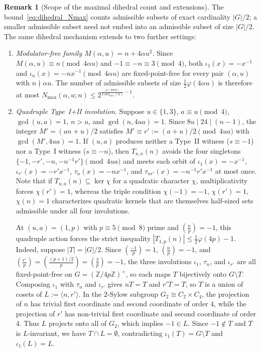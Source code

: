 \documentclass[11pt, a4paper]{article}
\theoremstyle{plain}
\theoremstyle{definition}
\newtheorem{remark}[theorem]{Remark}
\newcommand{\Z}{\mathbb{Z}}
\newcommand{\leg}[2]{\left(\frac{#1}{#2}\right)}
\begin{document}
\begin{remark}[Scope of the maximal dihedral count and extensions]\label{thm:universal_dihedral_n_plus_4au2}\label{thm:quadruple_involution}\label{thm:destruction_quadratic_kernels}
The bound~\eqref{eq:dihedral_Nmax} counts admissible subsets of exact cardinality $|G|/2$; a smaller admissible subset need not embed into an admissible subset of size $|G|/2$. The same dihedral mechanism extends to two further settings:
\begin{enumerate}[(1)]
    \item \emph{Modulator-free family $M(\alpha,u)=n+4\alpha u^{2}$.} Since $M(\alpha,u)\equiv n\pmod{4\alpha u}$ and $-1\equiv-n\equiv3\pmod 4$, both $\iota_1(x)=-x^{-1}$ and $\iota_n(x)=-nx^{-1}\pmod{4\alpha u}$ are fixed-point-free for every pair $(\alpha,u)$ with $n\nmid\alpha u$. The number of admissible subsets of size $\frac12\varphi(4\alpha u)$ is therefore at most $N_{\max}(\alpha,u;n)\le 2^{\frac{\varphi(4\alpha u)}{2\operatorname{ord}_{4\alpha u}(n)}-1}$.
    \item \emph{Quadruple Type~I+II involution.} Suppose $u\in\{1,3\}$, $a\equiv u\pmod 4$, $\gcd(u,a)=1$, $n>u$, and $\gcd(n,4ua)=1$. Since $8u\mid 24\mid(n-1)$, the integer $M'=(an+u)/2$ satisfies $M'\equiv r':=(a+u)/2\pmod{4ua}$ with $\gcd(M',4ua)=1$. If $(u,a)$ produces neither a Type~II witness ($s\equiv-1$) nor a Type~I witness ($s\equiv-n$), then $T_{u,a}(n)$ avoids the four singletons $\{-1,-r',-n,-n^{-1}r'\}\pmod{4ua}$ and meets each orbit of $\iota_1(x)=-x^{-1}$, $\iota_{r'}(x)=-r'x^{-1}$, $\tau_n(x)=-nx^{-1}$, and $\tau_{nr'}(x)=-n^{-1}r'x^{-1}$ at most once. Note that if $T_{u,a}(n)\subseteq\ker\chi$ for a quadratic character $\chi$, multiplicativity forces $\chi(r')=1$, whereas the triple condition $\chi(-1)=-1$, $\chi(r')=1$, $\chi(n)=1$ characterizes quadratic kernels that are themselves half-sized sets admissible under all four involutions.

    At $(u,a)=(1,p)$ with $p\equiv5\pmod 8$ prime and $\leg{n}{p}=-1$, this quadruple action forces the strict inequality $|T_{1,p}(n)|\le\frac12\varphi(4p)-1$. Indeed, suppose $|T|=|G|/2$. Since $\leg{-1}{p}=1$, $\leg{n}{p}=-1$, and $\leg{r'}{p}=\leg{(p+1)/2}{p}=\leg{2}{p}=-1$, the three involutions $\iota_1$, $\tau_n$, and $\iota_{r'}$ are all fixed-point-free on $G=(\Z/4p\Z)^{\times}$, so each maps $T$ bijectively onto $G\setminus T$. Composing $\iota_1$ with $\tau_n$ and $\iota_{r'}$ gives $nT=T$ and $r'T=T$, so $T$ is a union of cosets of $L:=\langle n,r'\rangle$. In the $2$-Sylow subgroup $G_2\cong C_2\times C_4$, the projection of $n$ has trivial first coordinate and second coordinate of order $4$, while the projection of $r'$ has non-trivial first coordinate and second coordinate of order $4$. Thus $L$ projects onto all of $G_2$, which implies $-1\in L$. Since $-1\notin T$ and $T$ is $L$-invariant, we have $T\cap L=\emptyset$, contradicting $\iota_1(T)=G\setminus T$ and $\iota_1(L)=L$.
\end{enumerate}
\end{remark}
\end{document}
